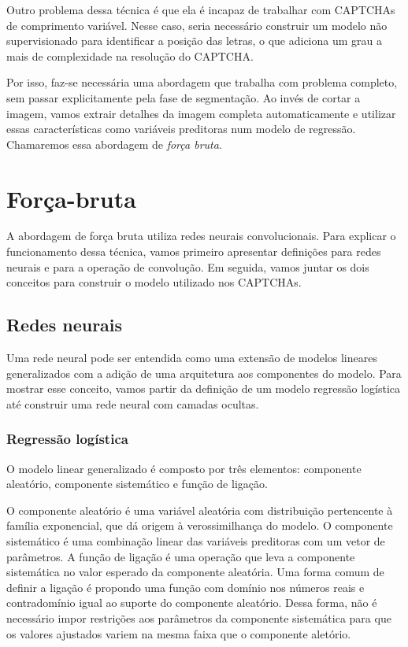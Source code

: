 \documentclass[12pt,]{report}
\begin{document}
Outro problema dessa técnica é que ela é incapaz de trabalhar com
CAPTCHAs de comprimento variável. Nesse caso, seria necessário construir
um modelo não supervisionado para identificar a posição das letras, o
que adiciona um grau a mais de complexidade na resolução do CAPTCHA.

Por isso, faz-se necessária uma abordagem que trabalha com problema
completo, sem passar explicitamente pela fase de segmentação. Ao invés
de cortar a imagem, vamos extrair detalhes da imagem completa
automaticamente e utilizar essas características como variáveis
preditoras num modelo de regressão. Chamaremos essa abordagem de
\emph{força bruta}.

\section{Força-bruta}\label{forca-bruta}

A abordagem de força bruta utiliza redes neurais convolucionais. Para
explicar o funcionamento dessa técnica, vamos primeiro apresentar
definições para redes neurais e para a operação de convolução. Em
seguida, vamos juntar os dois conceitos para construir o modelo
utilizado nos CAPTCHAs.

\subsection{Redes neurais}\label{redes-neurais}

Uma rede neural pode ser entendida como uma extensão de modelos lineares
generalizados com a adição de uma arquitetura aos componentes do modelo.
Para mostrar esse conceito, vamos partir da definição de um modelo
regressão logística até construir uma rede neural com camadas ocultas.

\subsubsection{Regressão logística}\label{regressao-logistica}

O modelo linear generalizado é composto por três elementos: componente
aleatório, componente sistemático e função de ligação.

O componente aleatório é uma variável aleatória com distribuição
pertencente à família exponencial, que dá origem à verossimilhança do
modelo. O componente sistemático é uma combinação linear das variáveis
preditoras com um vetor de parâmetros. A função de ligação é uma
operação que leva a componente sistemática no valor esperado da
componente aleatória. Uma forma comum de definir a ligação é propondo
uma função com domínio nos números reais e contradomínio igual ao
suporte do componente aleatório. Dessa forma, não é necessário impor
restrições aos parâmetros da componente sistemática para que os valores
ajustados variem na mesma faixa que o componente aletório.
\end{document}
